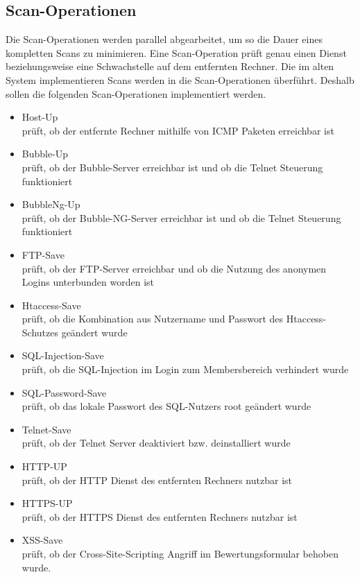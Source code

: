\subsection{Scan-Operationen}

Die Scan-Operationen werden parallel abgearbeitet, um so die Dauer eines kompletten Scans zu minimieren. Eine Scan-Operation prüft genau einen Dienst beziehungsweise eine Schwachstelle auf dem entfernten Rechner. Die im alten System implementieren Scans werden in die Scan-Operationen überführt. Deshalb sollen die folgenden Scan-Operationen implementiert werden.

\begin{itemize}
	\item Host-Up \\
	prüft, ob der entfernte Rechner mithilfe von ICMP Paketen erreichbar ist
	\item Bubble-Up \\
	prüft, ob der Bubble-Server erreichbar ist und ob die Telnet Steuerung funktioniert
	\item BubbleNg-Up\\
	prüft, ob der Bubble-NG-Server erreichbar ist und ob die Telnet Steuerung funktioniert
	\item FTP-Save\\
	prüft, ob der FTP-Server erreichbar und ob die Nutzung des anonymen Logins unterbunden worden ist
	\item Htaccess-Save\\
	prüft, ob die Kombination aus Nutzername und Passwort des Htaccess-Schutzes geändert wurde
	\item SQL-Injection-Save\\
	prüft, ob die SQL-Injection im Login zum Membersbereich verhindert wurde
	\item SQL-Password-Save\\
	prüft, ob das lokale Passwort des SQL-Nutzers root geändert wurde
	\item Telnet-Save\\
	prüft, ob der Telnet Server deaktiviert bzw. deinstalliert wurde
	\item HTTP-UP\\
	prüft, ob der HTTP Dienst des entfernten Rechners nutzbar ist
	\item HTTPS-UP\\
	prüft, ob der HTTPS Dienst des entfernten Rechners nutzbar ist
	\item XSS-Save\\
	prüft, ob der Cross-Site-Scripting Angriff im Bewertungsformular behoben wurde.
\end{itemize}

